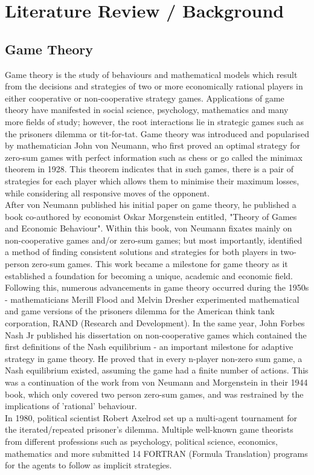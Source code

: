 \documentclass[11pt, a4paper]{article}
\title{\vspace{-7cm}}
\author{}
\date{}
\begin{document}
\maketitle

\section{Literature Review / Background}

\subsection{Game Theory}
Game theory is the study of behaviours and mathematical models which result from the decisions and strategies of two or more economically rational players in either cooperative or non-cooperative strategy games. Applications of game theory have manifested in social science, psychology, mathematics and many more fields of study; however, the root interactions lie in strategic games such as the prisoners dilemma or tit-for-tat. Game theory was introduced and popularised by mathematician John von Neumann, who first proved an optimal strategy for zero-sum games with perfect information such as chess or go called the minimax theorem in 1928. This theorem indicates that in such games, there is a pair of strategies for each player which allows them to minimise their maximum losses, while considering all responsive moves of the opponent. \\
\noindent
After von Neumann published his initial paper on game theory, he published a book co-authored by economist Oskar Morgenstein entitled, "Theory of Games and Economic Behaviour". Within this book, von Neumann fixates mainly on non-cooperative games and/or zero-sum games; but most importantly, identified a method of finding consistent solutions and strategies for both players in two-person zero-sum games. This work became a milestone for game theory as it established a foundation for becoming a unique, academic and economic field. \\
\noindent
Following this, numerous advancements in game theory occurred during the 1950s - mathematicians Merill Flood and Melvin Dresher experimented mathematical and game versions of the prisoners dilemma for the American think tank corporation, RAND (Research and Development). In the same year, John Forbes Nash Jr published his dissertation on non-cooperative games which contained the first definitions of the Nash equilibrium - an important milestone for adaptive strategy in game theory. He proved that in every n-player non-zero sum game, a Nash equilibrium existed, assuming the game had a finite number of actions. This was a continuation of the work from von Neumann and Morgenstein in their 1944 book, which only covered two person zero-sum games, and was restrained by the implications of 'rational' behaviour. \\
\noindent
In 1980, political scientist Robert Axelrod set up a multi-agent tournament for the iterated/repeated prisoner's dilemma. Multiple well-known game theorists from different professions such as psychology, political science, economics, mathematics and more submitted 14 FORTRAN (Formula Translation) programs for the agents to follow as implicit strategies.

\noindent

\clearpage
\end{document}
